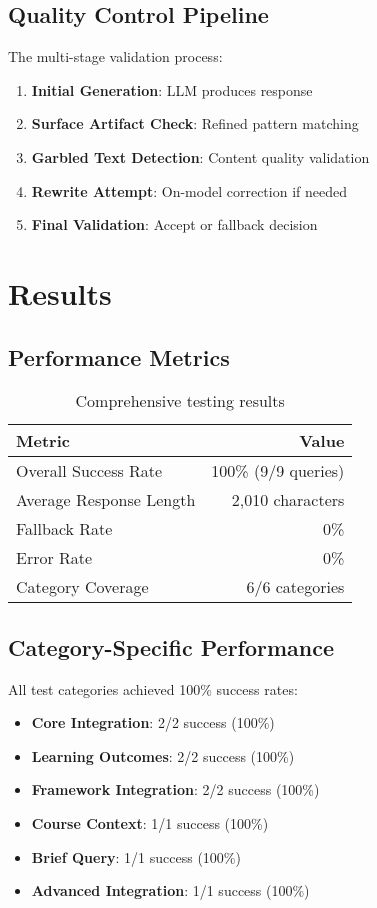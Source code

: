 \documentclass[12pt,a4paper]{article}
\begin{document}
\subsection{Quality Control Pipeline}
The multi-stage validation process:

\begin{enumerate}
    \item \textbf{Initial Generation}: LLM produces response
    \item \textbf{Surface Artifact Check}: Refined pattern matching
    \item \textbf{Garbled Text Detection}: Content quality validation
    \item \textbf{Rewrite Attempt}: On-model correction if needed
    \item \textbf{Final Validation}: Accept or fallback decision
\end{enumerate}

\section{Results}

\subsection{Performance Metrics}
\begin{table}[H]
\centering
\begin{tabular}{@{}lr@{}}
\toprule
\textbf{Metric} & \textbf{Value} \\
\midrule
Overall Success Rate & 100\% (9/9 queries) \\
Average Response Length & 2,010 characters \\
Fallback Rate & 0\% \\
Error Rate & 0\% \\
Category Coverage & 6/6 categories \\
\bottomrule
\end{tabular}
\caption{Comprehensive testing results}
\end{table}

\subsection{Category-Specific Performance}
All test categories achieved 100\% success rates:

\begin{itemize}
    \item \textbf{Core Integration}: 2/2 success (100\%)
    \item \textbf{Learning Outcomes}: 2/2 success (100\%)
    \item \textbf{Framework Integration}: 2/2 success (100\%)
    \item \textbf{Course Context}: 1/1 success (100\%)
    \item \textbf{Brief Query}: 1/1 success (100\%)
    \item \textbf{Advanced Integration}: 1/1 success (100\%)
\end{itemize}
\end{document}
